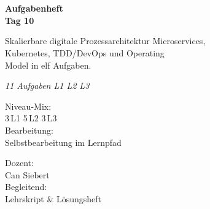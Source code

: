 \documentclass[11pt,a4paper,oneside]{article}
\newcommand{\caveatfontfallback}{\itshape}
\newcommand\caveatfont{\caveatfontfallback}%
\begin{document}
\begin{titlepage}
  \pagestyle{empty}
  \vspace*{1.5cm}
  \\[2pt]
  \noindent{\color{lpAccent}\rule{\linewidth}{1.2pt}}\\[4pt]

  \vspace{3cm}
  {\sffamily\fontsize{30}{34}\selectfont\bfseries\color{lpInk}Aufgabenheft\\Tag 10\par}

  \vspace{0.7cm}
  {\sffamily\large\color{lpGray}Skalierbare digitale Prozess\-architektur \textendash{} Microservices,\\Kubernetes, TDD/DevOps und Operating\\Model in elf Aufgaben.\par}

  \vspace{1.5cm}
  {\caveatfont\LARGE\color{lpAmber}11 Aufgaben \textperiodcentered{} L1 \textperiodcentered{} L2 \textperiodcentered{} L3}\par

  \vfill

  \noindent\begin{minipage}{0.55\linewidth}
    {\sffamily\footnotesize\color{lpGray}Niveau-Mix:}\\
    {\sffamily\small\color{lpInk}3\,\textsf{L1} \textperiodcentered{} 5\,\textsf{L2} \textperiodcentered{} 3\,\textsf{L3}}\\[10pt]
    {\sffamily\footnotesize\color{lpGray}Bearbeitung:}\\
    {\sffamily\small\color{lpInk}Selbstbearbeitung im Lernpfad}
  \end{minipage}\hfill
  \begin{minipage}{0.4\linewidth}
    \raggedleft
    {\sffamily\footnotesize\color{lpGray}Dozent:}\\
    {\sffamily\small\color{lpInk}Can Siebert}\\[10pt]
    {\sffamily\footnotesize\color{lpGray}Begleitend:}\\
    {\sffamily\small\color{lpInk}Lehrskript \& L\"osungsheft}
  \end{minipage}

  \vspace{0.5cm}
  \noindent{\color{lpAccent}\rule{\linewidth}{0.6pt}}
\end{titlepage}
\end{document}
